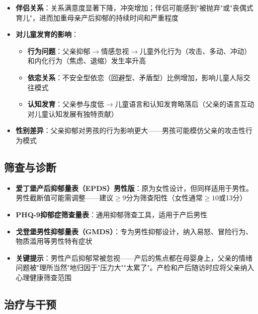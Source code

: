 \begin{enumerate}
\begin{itemize}[leftmargin=2cm]
	\item \textbf{伴侣关系}：关系满意度显著下降，冲突增加；伴侣可能感到"被抛弃"或"丧偶式育儿"，进而加重母亲产后抑郁的持续时间和严重程度
	\item \textbf{对儿童发育的影响}：
	\begin{itemize}
		\item \textbf{行为问题}：父亲抑郁$\rightarrow$情感忽视$\rightarrow$儿童外化行为（攻击、多动、冲动）和内化行为（焦虑、退缩）发生率升高
		\item \textbf{依恋关系}：不安全型依恋（回避型、矛盾型）比例增加，影响儿童人际交往模式
		\item \textbf{认知发育}：父亲参与度低$\rightarrow$儿童语言和认知发育略落后（父亲的语言互动对儿童认知发展有独特贡献）
	\end{itemize}
	\item \textbf{性别差异}：父亲抑郁对男孩的行为影响更大——男孩可能模仿父亲的攻击性行为模式
\end{itemize}

\subsection{筛查与诊断}

\begin{itemize}[leftmargin=2cm]
	\item \textbf{爱丁堡产后抑郁量表（EPDS）男性版}：原为女性设计，但同样适用于男性。男性截断值可能需调整——建议$\geq 9$分为筛查阳性（女性通常$\geq 10$或13分）
	\item \textbf{PHQ-9抑郁症筛查量表}：通用抑郁筛查工具，适用于产后男性
	\item \textbf{戈登堡男性抑郁量表（GMDS）}：专为男性抑郁设计，纳入易怒、冒险行为、物质滥用等男性特有症状
	\item \textbf{关键提示}：男性产后抑郁常被忽视——产后的焦点都在母婴身上，父亲的情绪问题被"理所当然"地归因于"压力大""太累了"。产检和产后随访时应将父亲纳入心理健康筛查范围
\end{itemize}

\subsection{治疗与干预}


\end{enumerate}
